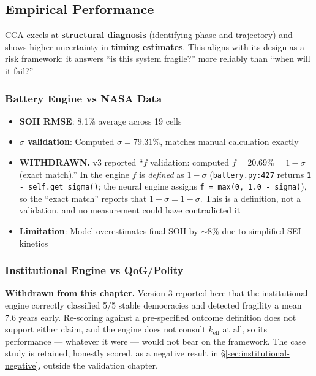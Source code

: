 \documentclass[11pt,a4paper]{article}
\theoremstyle{definition}
\theoremstyle{remark}
\newcommand{\keff}{k_{\text{eff}}}
\begin{document}
\subsection{Empirical Performance}
\label{sec:empirical-performance}

CCA excels at \textbf{structural diagnosis} (identifying phase and trajectory) and shows higher uncertainty in \textbf{timing estimates}. This aligns with its design as a risk framework: it answers ``is this system fragile?'' more reliably than ``when will it fail?''

\subsubsection{Battery Engine vs NASA Data}

\begin{itemize}[noitemsep]
    \item \textbf{SOH RMSE}: 8.1\% average across 19 cells
    \item \textbf{$\sigma$ validation}: Computed $\sigma = 79.31\%$, matches manual calculation exactly
    \item \textbf{WITHDRAWN.} v3 reported ``$f$ validation: computed $f = 20.69\% = 1-\sigma$ (exact match).'' In the engine $f$ is \emph{defined} as $1-\sigma$ (\texttt{battery.py:427} returns \texttt{1 - self.get\_sigma()}; the neural engine assigns \texttt{f = max(0, 1.0 - sigma)}), so the ``exact match'' reports that $1-\sigma = 1-\sigma$. This is a definition, not a validation, and no measurement could have contradicted it
    \item \textbf{Limitation}: Model overestimates final SOH by $\sim$8\% due to simplified SEI kinetics
\end{itemize}

\subsubsection{Institutional Engine vs QoG/Polity}

\textbf{Withdrawn from this chapter.} Version 3 reported here that the institutional engine
correctly classified 5/5 stable democracies and detected fragility a mean 7.6 years early.
Re-scoring against a pre-specified outcome definition does not support either claim, and the
engine does not consult $\keff$ at all, so its performance --- whatever it were --- would not
bear on the framework. The case study is retained, honestly scored, as a negative result in
\S\ref{sec:institutional-negative}, outside the validation chapter.
\end{document}
